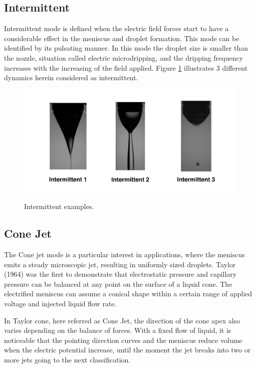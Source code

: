 \subsection{Intermittent}
\label{subsec:Intermittent}

Intermittent mode is defined when the electric field forces start to have a considerable effect in the meniscus and droplet formation. 
This mode can be identified by its pulsating manner.
In this mode the droplet size is smaller than the nozzle, situation called electric microdripping, and the dripping frequency increases with the increasing of the field applied.
Figure \ref{fig:intermittent_example} illustrates 3 different dynamics herein considered as intermittent.


  \begin{figure}[H]
      \center
      \includegraphics[width=15cm]{Figuras/19:03/intermittent_example.png}
      \label{fig:intermittent_example}
      \caption{Intermittent examples.}
  \end{figure}


\subsection{Cone Jet}
\label{subsec:Cone Jet}

The Cone jet mode is a particular interest in applications, where the meniscus emits a steady microscopic jet, resulting in uniformly sized droplets. 
Taylor (1964)\cite{taylor} was the first to demonstrate that electrostatic pressure and capillary pressure can be balanced at any point on the surface of a liquid cone.
The electrified meniscus can assume a conical shape within a certain range of applied voltage and injected liquid flow rate. 

In Taylor cone, here referred as Cone Jet, the direction of the cone apex also varies depending on the balance of forces. 
With a fixed flow of liquid, it is noticeable that the pointing direction curves and the meniscus reduce volume when the electric potential increase, until the moment the jet breaks into two or more jets going to the next classification. 

